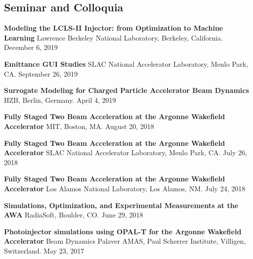 \documentclass[11pt,a4paper,sans]{moderncv}        %
\begin{document}
\subsection{Seminar and Colloquia}
\textbf{Modeling the LCLS-II Injector: from Optimization to Machine Learning}\newline
Lawrence Berkeley National Laboratory, Berkeley, California. December 6, 2019
\vspace{0.3em}

\textbf{Emittance GUI Studies}\newline
SLAC National Accelerator Laboratory, Menlo Park, CA. September 26, 2019
\vspace{0.3em}

\textbf{Surrogate Modeling for Charged Particle Accelerator Beam Dynamics}\newline
HZB, Berlin, Germany. April 4, 2019
\vspace{0.3em}

\textbf{Fully Staged Two Beam Acceleration at the Argonne Wakefield Accelerator}\newline
MIT, Boston, MA. August 20, 2018 
\vspace{0.3em}

\textbf{Fully Staged Two Beam Acceleration at the Argonne Wakefield Accelerator}\newline
SLAC National Accelerator Laboratory, Menlo Park, CA. July 26, 2018 
\vspace{0.3em}

\textbf{Fully Staged Two Beam Acceleration at the Argonne Wakefield Accelerator}\newline
Los Alamos National Laboratory, Los Alamos, NM. July 24, 2018 
\vspace{0.3em}

\textbf{Simulations, Optimization, and Experimental Measurements at the AWA}\newline
RadiaSoft, Boulder, CO. June 29, 2018 
\vspace{0.3em}

\textbf{Photoinjector simulations using OPAL-T for the Argonne Wakefield Accelerator}\newline
Beam Dynamics Palaver AMAS, Paul Scherrer Institute, Villigen, Switzerland. May 23, 2017 
\vspace{0.3em}
\end{document}
